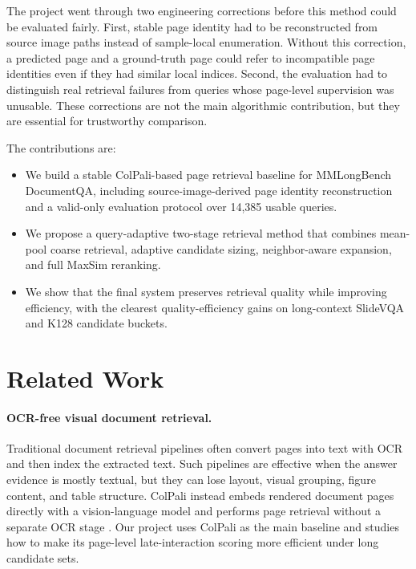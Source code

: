 \documentclass[11pt]{article}
\begin{document}
The project went through two engineering corrections before this method could be evaluated fairly. First, stable page identity had to be reconstructed from source image paths instead of sample-local enumeration. Without this correction, a predicted page and a ground-truth page could refer to incompatible page identities even if they had similar local indices. Second, the evaluation had to distinguish real retrieval failures from queries whose page-level supervision was unusable. These corrections are not the main algorithmic contribution, but they are essential for trustworthy comparison.

The contributions are:
\begin{itemize}
    \item We build a stable ColPali-based page retrieval baseline for MMLongBench DocumentQA, including source-image-derived page identity reconstruction and a valid-only evaluation protocol over 14,385 usable queries.
    \item We propose a query-adaptive two-stage retrieval method that combines mean-pool coarse retrieval, adaptive candidate sizing, neighbor-aware expansion, and full MaxSim reranking.
    \item We show that the final system preserves retrieval quality while improving efficiency, with the clearest quality-efficiency gains on long-context SlideVQA and K128 candidate buckets.
\end{itemize}

\section{Related Work}

\paragraph{OCR-free visual document retrieval.}
Traditional document retrieval pipelines often convert pages into text with OCR and then index the extracted text. Such pipelines are effective when the answer evidence is mostly textual, but they can lose layout, visual grouping, figure content, and table structure. ColPali instead embeds rendered document pages directly with a vision-language model and performs page retrieval without a separate OCR stage \citep{faysse2024colpali,colpalimodel}. Our project uses ColPali as the main baseline and studies how to make its page-level late-interaction scoring more efficient under long candidate sets.
\end{document}
